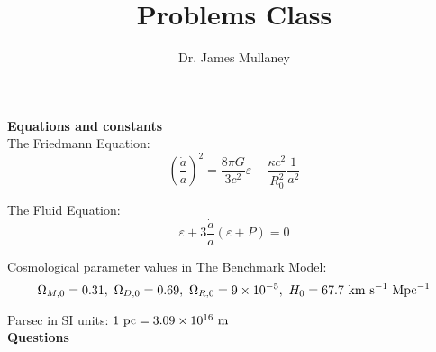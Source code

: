 \documentclass[11pt]{article}
\begin{document}
 
\title{Problems Class }
\author{Dr. James Mullaney}
\maketitle

{\bf Equations and constants}\\

The Friedmann Equation:
\begin{equation*}
    \left(\frac{\dot{a}}{a}\right)^2 = \frac{8\pi G}{3c^2}\varepsilon{}-\frac{\kappa c^2}{R_0^2}\frac{1}{a^2}
\end{equation*}

The Fluid Equation:
\begin{equation*}
    \dot{\varepsilon{}}+3\frac{\dot{a}}{a}(\varepsilon{}+P) = 0
\end{equation*}

Cosmological parameter values in The Benchmark Model:
\begin{equation*}
\Omega_{M,0} = 0.31,~\Omega_{D,0} = 0.69,~\Omega_{R,0} = 9\times10^{-5},~H_0 = 67.7~{\rm km~s^{-1}~Mpc^{-1}}
\end{equation*}

Parsec in SI units: ${\rm 1~pc = 3.09\times10^{16}~m}$\\

{\bf Questions}\\
\end{document}
